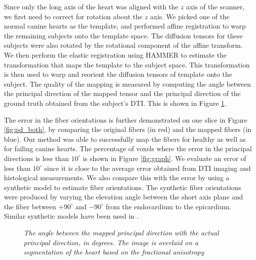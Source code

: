 Since only the long axis of the heart was aligned with the $z$ axis of the scanner, we first need to correct for rotation about the $z$ axis. We picked one of the normal canine hearts as the template, and performed affine registration to warp the remaining subjects onto the template space. The diffusion tensors for these subjects were also rotated by the rotational component of the affine transform. We then perform the elastic registration using HAMMER to estimate the transformation that maps the template to the subject space. This transformation is then used to warp and reorient the diffusion tensors of template onto the subject. The quality of the mapping is measured by computing the angle between the principal direction of the mapped tensor and the principal direction of the ground truth obtained from the subject's DTI. This is shown in Figure \ref{fig:dot}.

The error in the fiber orientations is further demonstrated on one slice in Figure \ref{fig:pd_both}, by comparing the original fibers (in red) and the mapped fibers (in blue). Our method was able to successfully map the fibers for healthy as well as for failing canine hearts. The percentage of voxels where the error in the principal directions is less than $10^\circ$ is shown in Figure \ref{fig:graph}. We evaluate an error of less than $10^\circ$ since it is close to the average error obtained from DTI imaging \cite{scollan98} and histological measurements\cite{streeter73}. We also compare this with the error by using a synthetic model to estimate fiber orientations. The synthetic fiber orientations were produced by varying the elevation angle between the short axis plane and the fiber between $+90^\circ$ and $-90^\circ$ from the endocardium to the epicardium. Similar synthetic models have been used in \cite{sachse04, sermesant04}.

\begin{figure}
\begin{center}
\caption{\em \small The angle between the mapped principal direction with the actual principal direction, in degrees. The image is overlaid on a segmentation of the heart based on the fractional anisotropy } 
\label{fig:dot}
\end{center}  
\end{figure} 

